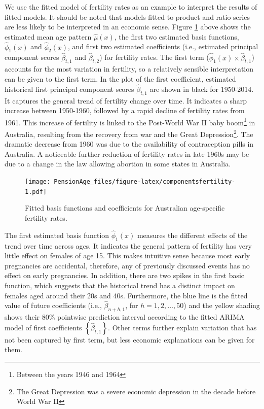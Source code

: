 \documentclass[11pt,a4paper,]{article}
\begin{document}
We use the fitted model of fertility rates as an example to interpret
the results of fitted models. It should be noted that models fitted to
product and ratio series are less likely to be interpreted in an
economic sense. Figure \ref{fig:componentsfertility} above shows the
estimated mean age pattern \(\widehat{\mu}(x)\), the first two estimated
basis functions, \(\widehat{\phi}_1(x)\) and \(\widehat{\phi}_2(x)\),
and first two estimated coefficients (i.e., estimated principal
component scores \(\widehat{\beta}_{t,1}\) and
\(\widehat{\beta}_{t,2}\)) for fertility rates. The first term
(\(\widehat{\phi}_1(x)\times \widehat{\beta}_{t,1}\)) accounts for the
most variation in fertility, so a relatively sensible interpretation can
be given to the first term. In the plot of the first coefficient,
estimated historical first principal component scores
\(\widehat{\beta}_{t,1}\) are shown in black for 1950-2014. It captures
the general trend of fertility change over time. It indicates a sharp
increase between 1950-1960, followed by a rapid decline of fertility
rates from 1961. This increase of fertility is linked to the Post-World
War II baby boom\footnote{Between the years 1946 and 1964} in Australia,
resulting from the recovery from war and the Great
Depression\footnote{The Great Depression was a severe economic depression in the decade before World War II}.
The dramatic decrease from 1960 was due to the availability of
contraception pills in Australia. A noticeable further reduction of
fertility rates in late 1960s may be due to a change in the law allowing
abortion in some states in Australia.

\begin{figure}
\centering
\texttt{[image: PensionAge\_files/figure-latex/componentsfertility-1.pdf]}
\caption{\label{fig:componentsfertility}Fitted basis functions and
coefficients for Australian age-specific fertility rates.}
\end{figure}

The first estimated basis function \(\widehat{\phi}_1(x)\) measures the
different effects of the trend over time across ages. It indicates the
general pattern of fertility has very little effect on females of age
15. This makes intuitive sense because most early pregnancies are
accidental, therefore, any of previously discussed events has no effect
on early pregnancies. In addition, there are two spikes in the first
basic function, which suggests that the historical trend has a distinct
impact on females aged around their 20s and 40s. Furthermore, the blue
line is the fitted value of future coefficients (i.e.,
\(\widehat{\beta}_{n+h,1}\), for \(h=1,2,\dots,50\)) and the yellow
shading shows their 80\% pointwise prediction interval according to the
fitted ARIMA model of first coefficients
\(\left\{\widehat{\beta}_{t,1}\right\}\). Other terms further explain
variation that has not been captured by first term, but less economic
explanations can be given for them.
\end{document}
